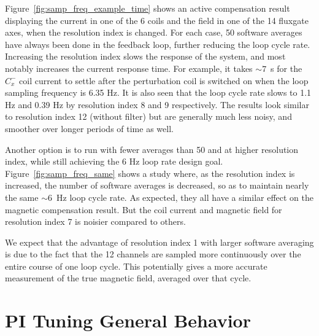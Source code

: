 Figure~\ref{fig:samp_freq_example_time} shows an active compensation
result displaying the current in one of the 6 coils and the field in
one of the 14 fluxgate axes, when the resolution index is changed.
For each case, 50 software averages have always been done in the
feedback loop, further reducing the loop cycle rate.  Increasing the
resolution index slows the response of the system, and most notably increases the current response time. For example, it takes $\sim 7$~s
for the $C_x^-$ coil current to settle after the perturbation coil is
switched on when the loop sampling frequency is 6.35 Hz. It is also
seen that the loop cycle rate slows to 1.1 Hz and 0.39 Hz by
resolution index 8 and 9 respectively.  The results look similar to
resolution index 12 (without filter) but are generally much less
noisy, and smoother over longer periods of time as well.



Another option is to run with fewer averages than 50 and at higher
resolution index, while still achieving the 6 Hz loop rate design
goal.  Figure~\ref{fig:samp_freq_same} shows a study where, as the
resolution index is increased, the number of software averages is
decreased, so as to maintain nearly the same $\sim 6$~Hz loop cycle
rate.  As expected, they all have a similar effect on the magnetic
compensation result.  But the coil current and magnetic field for
resolution index 7 is noisier compared to others. 

We expect that the advantage of resolution index 1 with larger
software averaging is due to the fact that the 12 channels are sampled
more continuously over the entire course of one loop cycle.  This
potentially gives a more accurate measurement of the true magnetic
field, averaged over that cycle.


% 

\section{PI Tuning General Behavior}\label{sec:pi_behave}

